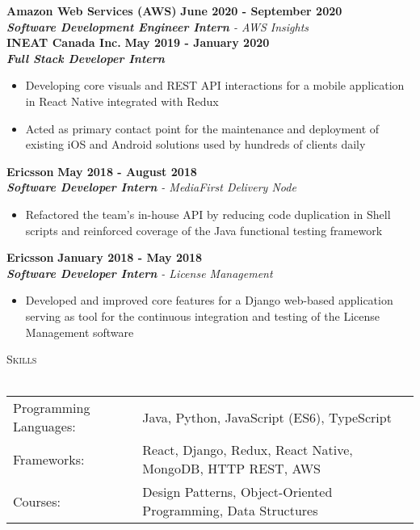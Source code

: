 \documentclass[a4paper]{article}
\newcommand{\lineunder} {
    \vspace*{-8pt} \\
    \hspace*{-18pt} \hrulefill \\
}
\newcommand{\header} [1] {
    {\hspace*{-18pt}\vspace*{6pt} \textsc{#1}}
    \vspace*{-6pt} \lineunder
}
\begin{document}
\textbf{Amazon Web Services (AWS)} \hfill \textbf{June 2020 - September 2020}\\
\textit{\textbf{Software Development Engineer Intern} - AWS Insights}\\
\vspace{4mm}
\textbf{INEAT Canada Inc.} \hfill \textbf{May 2019 - January 2020}\\
\textit{\textbf{Full Stack Developer Intern}}\\
\begin{itemize} \itemsep 0.1pt
	\item Developing core visuals and REST API interactions for a mobile application in React Native integrated with Redux
	\item Acted as primary contact point for the maintenance and deployment of existing iOS and Android solutions used by hundreds of clients daily
\end{itemize}
\textbf{Ericsson} \hfill \textbf{May 2018 - August 2018}\\
\textit{\textbf{Software Developer Intern} - MediaFirst Delivery Node} \\
\begin{itemize} \itemsep 0.1pt
	\item Refactored the team's in-house API by reducing code duplication in Shell scripts and reinforced coverage of the Java functional testing framework
\end{itemize}
\textbf{Ericsson} \hfill \textbf{January 2018 - May 2018}\\
\textit{\textbf{Software Developer Intern} - License Management} \\
\begin{itemize} \itemsep 0.1pt
	\item Developed and improved core features for a Django web-based application serving as tool for the continuous integration and testing of the License Management software
\end{itemize}

\header{Skills}
\vspace*{2mm}
\begin{tabular}{ l l }
	Programming Languages: & Java, Python, JavaScript (ES6), TypeScript                             \\
	Frameworks:            & React, Django, Redux, React Native, MongoDB, HTTP REST, AWS \\
	Courses:               & Design Patterns, Object-Oriented Programming, Data Structures       \\
\end{tabular}
\vspace{2mm}
\end{document}
